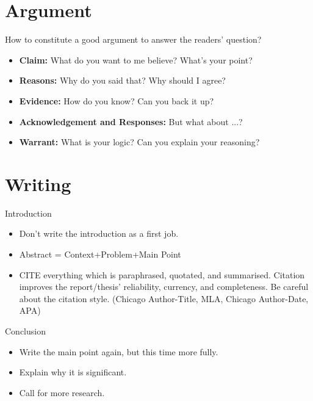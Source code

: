 \documentclass{beamer}
\begin{document}
\section{Argument}	
	\begin{frame}
		\begin{block}{How to constitute a good argument to answer the readers' question? }
		\end{block}
		\begin{itemize}
			 \item \textbf{Claim: } What do you want to me believe? What's your point?
			\onslide<2-> \item \textbf{Reasons: } Why do you said that? Why should I agree?
			\onslide<3-> \item \textbf{Evidence: } How do you know? Can you back it up? 
			\onslide<4-> \item \textbf{Acknowledgement and Responses: } But what about ...?
			\onslide<5-> \item \textbf{Warrant: } What is your logic? Can you explain your reasoning?  
		\end{itemize}
	\end{frame}
\section{Writing}	
	\begin{frame}
		\begin{block}{Introduction}
		\end{block}
		\begin{itemize}
			 \item Don't write the introduction as a first job.
			\onslide<2-> \item Abstract = Context+Problem+Main Point
			\onslide<3-> \item CITE everything which is paraphrased, quotated, and summarised. Citation improves the report/thesis' reliability, currency, and completeness. Be careful about the citation style. (Chicago Author-Title, MLA, Chicago Author-Date, APA)
		\end{itemize}
	\end{frame}
	\begin{frame}
		\begin{block}{Conclusion}
		\end{block}
		\begin{itemize}
			 \item Write the main point again, but this time more fully.
			\onslide<2-> \item Explain why it is significant.
			\onslide<3-> \item Call for more research.
		\end{itemize}
	\end{frame}
\end{document}
